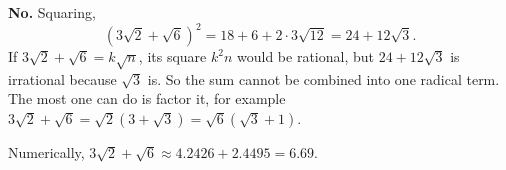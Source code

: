\textbf{No.} Squaring,
\[
\left(3\sqrt2+\sqrt6\right)^2=18+6+2\cdot3\sqrt{12}=24+12\sqrt3 .
\]
If $3\sqrt2+\sqrt6=k\sqrt n$, its square $k^2n$ would be rational, but $24+12\sqrt3$ is irrational because $\sqrt3$ is. So the sum cannot be combined into one radical term. The most one can do is factor it, for example $3\sqrt2+\sqrt6=\sqrt2\left(3+\sqrt3\right)=\sqrt6\left(\sqrt3+1\right)$.

Numerically, $3\sqrt2+\sqrt6\approx4.2426+2.4495=\boxed{6.69}$.
